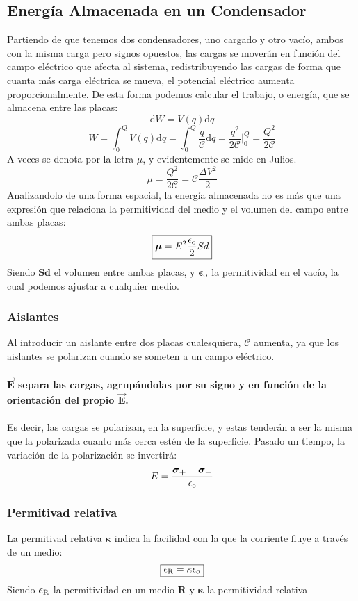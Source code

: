 \subsection{Energía Almacenada en un Condensador}
\noindent Partiendo de que tenemos dos condensadores, uno cargado y otro vacío, ambos con la misma carga pero signos opuestos, las cargas se moverán en función del campo eléctrico que afecta al sistema, redistribuyendo las cargas de forma que cuanta más carga eléctrica se mueva, el potencial eléctrico aumenta proporcionalmente. De esta forma podemos calcular el trabajo, o energía, que se almacena entre las placas:
\[
        \mathrm{d}W = V(q)\mathrm{d}q
\]
\[
        W = \int_{0}^{Q} V(q)\mathrm{d}q = \int_{0}^{Q} \frac{q}{\mathcal{C}}\mathrm{d}q = \frac{q^2}{2\mathcal{C}} \Big|^Q_0 =\frac{Q^2}{2\mathcal{C}}
\]
A veces se denota por la letra \(\bm{\mathcal{\mu}}\), y evidentemente se mide en Julios.
\[
        \boxed{\bm{\mathcal{\mu}} = \frac{Q^2}{2\mathcal{C}} = \mathcal{C}\frac{\Delta V^2}{2}}
\]
Analizandolo de una forma espacial, la energía almacenada no es más que una expresión que relaciona la permitividad del medio y el volumen del campo entre ambas placas:
\[
        \boxed{\bm{\mathcal{\mu}} = E^2 \frac{\epsilon_\textnormal{o}}{2}Sd}
\]
Siendo \(\bm{Sd}\) el volumen entre ambas placas, y \(\bm{\epsilon_\textnormal{o}}\) la permitividad en el vacío, la cual podemos ajustar a cualquier medio.
\subsubsection{Aislantes}
\noindent Al introducir un aislante entre dos placas cualesquiera, \(\bm{\mathcal{C}}\) aumenta, ya que los aislantes se polarizan cuando se someten a un campo eléctrico.\\\\ \textbf{\(\bm{\vec{E}}\) separa las cargas, agrupándolas por su signo y en función de la orientación del propio \(\bm{\vec{E}}\).}
\\\\
Es decir, las cargas se polarizan, en la superficie, y estas tenderán a ser la misma que la polarizada cuanto más cerca estén de la superficie. Pasado un tiempo, la variación de la polarización se invertirá:
\[
        E = \frac{\bm{\sigma_+}-\bm{\sigma_-}}{\epsilon_{\textnormal{o}}}
\]
\subsubsection{Permitivad relativa}
\noindent La permitivad relativa \(\bm{\kappa }\) indica la facilidad con la que la corriente fluye a través de un medio:
\[
        \boxed{\epsilon_\textnormal{R} = \kappa \epsilon_\textnormal{o}}
\]
Siendo \(\bm{\epsilon_\textnormal{R}}\) la permitividad en un medio \(\bm{R}\) y \(\bm{\kappa}\) la permitividad relativa
